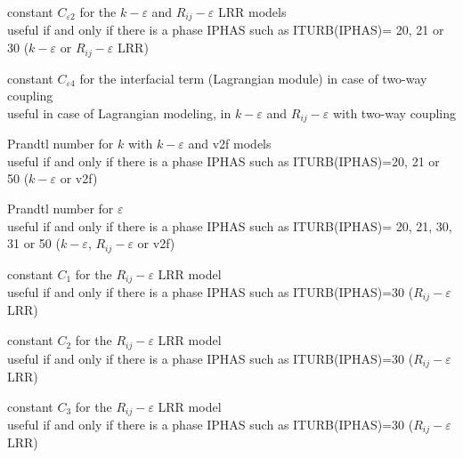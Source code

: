 {constant $C_{\varepsilon 2}$ for the $k-\varepsilon$ and
$R_{ij}-\varepsilon$ LRR models\\
useful if and only if there is a phase IPHAS such as ITURB(IPHAS)= 20, 21 or 30
($k-\varepsilon$ or $R_{ij}-\varepsilon$ LRR)}


{constant $C_{\varepsilon 4}$ for the interfacial term (Lagrangian module) in
case of two-way coupling\\
useful in case of Lagrangian modeling, in $k-\varepsilon$ and $R_{ij}-\varepsilon$
with two-way coupling} 

{Prandtl number for $k$ with $k-\varepsilon$ and v2f models\\
useful if and only if there is a phase IPHAS such as ITURB(IPHAS)=20, 21 or 50
($k-\varepsilon$ or v2f)}

{Prandtl number for $\varepsilon$\\
useful if and only if there is a phase IPHAS such as ITURB(IPHAS)= 20,
21, 30, 31 or 50 ($k-\varepsilon$, $R_{ij}-\varepsilon$ or v2f)}


{constant $C_1$ for the $R_{ij}-\varepsilon$ LRR model\\
useful if and only if there is a phase IPHAS such as ITURB(IPHAS)=30
($R_{ij}-\varepsilon$ LRR)}

{constant $C_2$ for the $R_{ij}-\varepsilon$ LRR model\\
useful if and only if there is a phase IPHAS such as ITURB(IPHAS)=30
($R_{ij}-\varepsilon$ LRR)}

{constant $C_3$ for the $R_{ij}-\varepsilon$ LRR model\\
useful if and only if there is a phase IPHAS such as ITURB(IPHAS)=30
($R_{ij}-\varepsilon$ LRR)}

